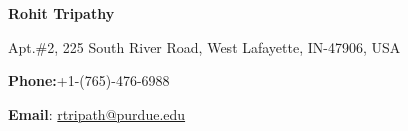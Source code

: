 \documentclass[11pt]{article}
\begin{document}
\centerline{\LARGE \textbf{Rohit Tripathy}}
\centerline{Apt.\#2, 225 South River Road, West Lafayette, IN-47906, USA}
\centerline{\textbf{Phone:}+1-(765)-476-6988}
\centerline{\textbf{Email}: \href{mailto:rtripath@purdue.edu}{rtripath@purdue.edu}}
\end{document}
